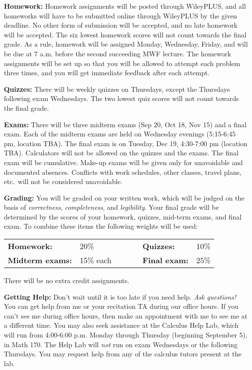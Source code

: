 \documentclass[12pt]{amsart}
\begin{document}
\medskip

\noindent
{\bf Homework:}
Homework assignments will be posted through
WileyPLUS, and all homeworks will have to be
submitted online through WileyPLUS by the given deadline.
No other form of submission will be accepted, and no
late homework will be accepted.
The six lowest homework scores will not count
towards the final grade.  As a rule, homework will be assigned Monday, Wednesday, Friday,
and will be due at 7 a.m. before the second succeeding
MWF lecture.
The homework assignments will be set up so that 
you will be allowed to attempt each problem three times, 
and you will get immediate feedback after each attempt.

\medskip

\noindent
{\bf Quizzes:}
There will be weekly quizzes on Thursdays, except
the Thursdays following exam Wednesdays.
The two lowest quiz scores will not count
towards the final grade.


\medskip

\noindent
{\bf Exams:}
There will be three midterm exams (Sep 20, Oct 18, Nov 15) and a final exam.  Each of the midterm exams are held on Wednesday evenings (5:15-6:45 pm, location TBA).  The final exam is on Tuesday, Dec 19, 4:30-7:00 pm (location TBA).  Calculators will not be allowed on the quizzes and the exams.  The final exam will be cumulative.  Make-up exams will be given only for unavoidable and documented absences.  Conflicts with work schedules, other classes, travel plans, etc.\ will not be considered unavoidable.

\medskip

\noindent
{\bf Grading:}
You will be graded on your written work, which will be
judged on the basis of {\it correctness}, 
{\it completeness}, and {\it legibility}.
Your final grade will be determined by the scores of
your homework, quizzes, mid-term exams, and final exam.
To combine these items the following weights will be used:

\begin{tabular}[c]{lllllll}
{\bf Homework:} & 20\% &&&& {\bf Quizzes:} & 10\%\\
{\bf Midterm exams:} & 15\% each &&&& {\bf Final exam:} & 25\%\\
\end{tabular}

\noindent
There will be no extra credit assignments.

\medskip

\noindent
{\bf Getting Help:}
Don't wait until it is too late if you need help. {\it Ask questions!}  You can get help from me or your recitation TA during our office hours. If you can't see me during office hours,  then make an appointment 
with me to see me at a different time. You may also seek assistance at the Calculus Help Lab, which
will run from 4:00-6:00 p.m. Monday through Thursday (beginning September 5), in Math 170. 
The Help Lab will {\it not} run on exam Wednesdays or the following Thursdays. 
You may request help from any of the calculus tutors present at the lab.
\end{document}
